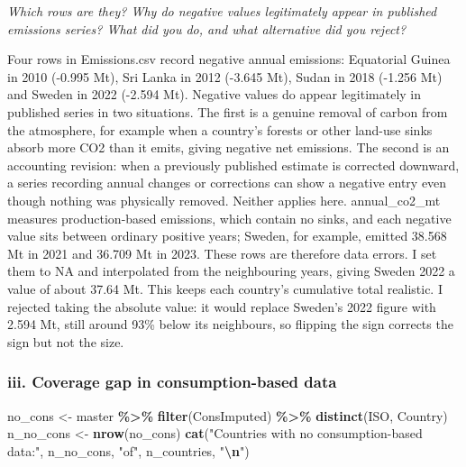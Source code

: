 \documentclass[
]{article}
\newenvironment{Shaded}{\begin{snugshade}}{\end{snugshade}}
\newcommand{\FunctionTok}[1]{\textcolor[rgb]{0.13,0.29,0.53}{\textbf{#1}}}
\newcommand{\NormalTok}[1]{#1}
\newcommand{\OtherTok}[1]{\textcolor[rgb]{0.56,0.35,0.01}{#1}}
\newcommand{\SpecialCharTok}[1]{\textcolor[rgb]{0.81,0.36,0.00}{\textbf{#1}}}
\newcommand{\StringTok}[1]{\textcolor[rgb]{0.31,0.60,0.02}{#1}}
\begin{document}
\emph{Which rows are they? Why do negative values legitimately appear in
published emissions series? What did you do, and what alternative did
you reject?}

Four rows in Emissions.csv record negative annual emissions: Equatorial
Guinea in 2010 (-0.995 Mt), Sri Lanka in 2012 (-3.645 Mt), Sudan in 2018
(-1.256 Mt) and Sweden in 2022 (-2.594 Mt). Negative values do appear
legitimately in published series in two situations. The first is a
genuine removal of carbon from the atmosphere, for example when a
country's forests or other land-use sinks absorb more CO2 than it emits,
giving negative net emissions. The second is an accounting revision:
when a previously published estimate is corrected downward, a series
recording annual changes or corrections can show a negative entry even
though nothing was physically removed. Neither applies here.
annual\_co2\_mt measures production-based emissions, which contain no
sinks, and each negative value sits between ordinary positive years;
Sweden, for example, emitted 38.568 Mt in 2021 and 36.709 Mt in 2023.
These rows are therefore data errors. I set them to NA and interpolated
from the neighbouring years, giving Sweden 2022 a value of about 37.64
Mt. This keeps each country's cumulative total realistic. I rejected
taking the absolute value: it would replace Sweden's 2022 figure with
2.594 Mt, still around 93\% below its neighbours, so flipping the sign
corrects the sign but not the size.

\subsubsection{iii. Coverage gap in consumption-based
data}\label{iii.-coverage-gap-in-consumption-based-data}

\begin{Shaded}
\begin{Highlighting}[]
\NormalTok{no\_cons }\OtherTok{\textless{}{-}}\NormalTok{ master }\SpecialCharTok{\%\textgreater{}\%}
  \FunctionTok{filter}\NormalTok{(ConsImputed) }\SpecialCharTok{\%\textgreater{}\%}
  \FunctionTok{distinct}\NormalTok{(ISO, Country)}
\NormalTok{n\_no\_cons }\OtherTok{\textless{}{-}} \FunctionTok{nrow}\NormalTok{(no\_cons)}
\FunctionTok{cat}\NormalTok{(}\StringTok{"Countries with no consumption{-}based data:"}\NormalTok{, n\_no\_cons, }\StringTok{"of"}\NormalTok{,}
\NormalTok{    n\_countries, }\StringTok{"}\SpecialCharTok{\textbackslash{}n}\StringTok{"}\NormalTok{)}
\end{Highlighting}
\end{Shaded}
\end{document}
